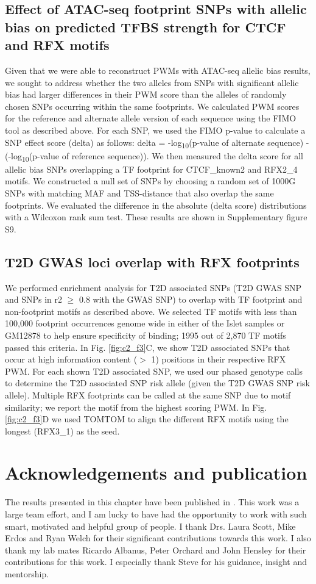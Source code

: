 \subsection{Effect of ATAC-seq footprint SNPs with allelic bias on predicted TFBS strength for CTCF and RFX motifs}
Given that we were able to reconstruct PWMs with ATAC-seq allelic bias results, we sought to address whether the two alleles from SNPs with significant allelic bias had larger differences in their PWM score than the alleles of randomly chosen SNPs occurring within the same footprints. We calculated PWM scores for the reference and alternate allele version of each sequence using the FIMO tool as described above. For each SNP, we used the FIMO p-value to calculate a SNP effect score (delta) as follows:  delta = -log\textsubscript{10}(p-value of alternate sequence) - (-log\textsubscript{10}(p-value of reference sequence)). We then measured the delta score for all allelic bias SNPs overlapping a TF footprint for CTCF\_known2 and RFX2\_4 motifs. We constructed a null set of SNPs by choosing a random set of 1000G SNPs with matching MAF and TSS-distance that also overlap the same footprints. We evaluated the difference in the absolute (delta score) distributions with a Wilcoxon rank sum test. These results are shown in Supplementary figure S9.

\subsection{T2D GWAS loci overlap with RFX footprints}
We performed enrichment analysis for T2D associated SNPs (T2D GWAS SNP and SNPs in r2 $\geq$ 0.8 with the GWAS SNP) to overlap with TF footprint and non-footprint motifs as described above. We selected TF motifs with less than 100,000 footprint occurrences genome wide in either of the Islet samples or GM12878 to help ensure specificity of binding; 1995 out of 2,870 TF motifs passed this criteria.  In Fig. \ref{fig:c2_f3}C, we show T2D associated SNPs that occur at high information content ($>$ 1) positions in their respective RFX PWM. For each shown T2D associated SNP, we used our phased genotype calls to determine the T2D associated SNP risk allele (given the T2D GWAS SNP risk allele). Multiple RFX footprints can be called at the same SNP due to motif similarity; we report the motif from the highest scoring PWM. In Fig. \ref{fig:c2_f3}D we used TOMTOM \cite{guptaQuantifyingSimilarityMotifs2007} to align the different RFX motifs using the longest (RFX3\_1) as the seed.


\section{Acknowledgements and publication}
The results presented in this chapter have been published in \cite{varshneyGeneticRegulatorySignatures2017}. This work was a large team effort, and I am lucky to have had the opportunity to work with such smart, motivated and helpful group of people. I thank Drs. Laura Scott, Mike Erdos and Ryan Welch for their significant contributions towards this work. I also thank my lab mates Ricardo Albanus, Peter Orchard and John Hensley for their contributions for this work. I especially thank Steve for his guidance, insight and mentorship.


